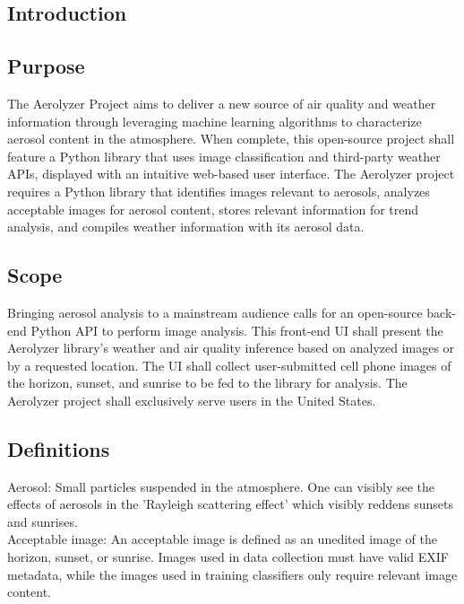 \documentclass[journal,10pt,draftclsnofoot,onecolumn]{IEEEtran}
\begin{document}
\tableofcontents
\clearpage

\begin{singlespace}

\section{Introduction}

\subsection{Purpose}
The Aerolyzer Project aims to deliver a new source of air quality and weather information through leveraging machine learning algorithms to characterize aerosol content in the atmosphere.
When complete, this open-source project shall feature a Python library that uses image classification and third-party weather APIs, displayed with an intuitive web-based user interface.
The Aerolyzer project requires a Python library that identifies images relevant to aerosols, analyzes acceptable images for aerosol content, stores relevant information for trend analysis, and compiles weather information with its aerosol data. 

\subsection{Scope}
Bringing aerosol analysis to a mainstream audience calls for an open-source back-end Python API to perform image analysis.
This front-end UI shall present the Aerolyzer library's weather and air quality inference based on analyzed images or by a requested location.
The UI shall collect user-submitted cell phone images of the horizon, sunset, and sunrise to be fed to the library for analysis.
The Aerolyzer project shall exclusively serve users in the United States.

\subsection{Definitions}
Aerosol: Small particles suspended in the atmosphere.
One can visibly see the effects of aerosols in the 'Rayleigh scattering effect' which visibly reddens sunsets and sunrises. \\

Acceptable image: An acceptable image is defined as an unedited image of the horizon, sunset, or sunrise.
Images used in data collection must have valid EXIF metadata, while the images used in training classifiers only require relevant image content.\\


\end{singlespace}
\end{document}
